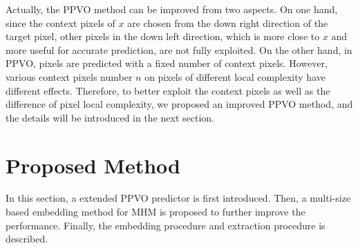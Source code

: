\documentclass[review,3p,10pt,sort&compress]{elsarticle}
\begin{document}
Actually, the PPVO method can be improved from two aspects. On one hand, since the context pixels of $x$ are chosen from the down right direction of the target pixel, other pixels in the down left direction, which is more close to $x$ and more useful for accurate prediction, are not fully exploited. On the other hand, in PPVO, pixels are predicted with a fixed number of context pixels. However, various context pixels number $n$ on pixels of different local complexity have different effects. Therefore, to better exploit the context pixels as well as the difference of pixel local complexity, we proposed an improved PPVO method, and the details will be introduced in the next section.
 



\section{Proposed Method}\label{sec:3}
In this section, a extended PPVO predictor is first introduced. Then, a multi-size based embedding method for MHM is proposed to further improve the performance. Finally, the embedding procedure and extraction procedure is described.
\end{document}
